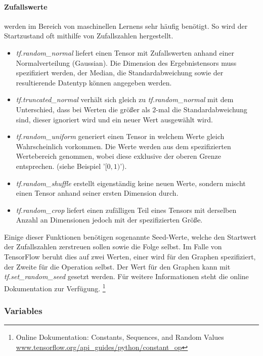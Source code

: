 \paragraph{Zufallswerte} werden im Bereich von maschinellen Lernens sehr häufig benötigt. 
So wird der Startzustand oft mithilfe von Zufallszahlen hergestellt. 

\begin{itemize}
	\item \textit{tf.random\_normal} liefert einen Tensor mit Zufallswerten anhand einer Normalverteilung (Gaussian). 
	Die Dimension des Ergebnistensors muss spezifiziert werden, der Median, die Standardabweichung sowie der resultierende Datentyp können angegeben werden. 
	\item \textit{tf.truncated\_normal} verhält sich gleich zu \textit{tf.random\_normal} mit dem Unterschied, dass bei Werten die größer als $2$-mal die Standardabweichung sind, dieser ignoriert wird und ein neuer Wert ausgewählt wird.
	\item \textit{tf.random\_uniform} generiert einen Tensor in welchem Werte gleich Wahrscheinlich vorkommen.
	Die Werte werden aus dem spezifizierten Wertebereich genommen, wobei diese exklusive der oberen Grenze entsprechen. (siehe Beispiel '$[0, 1)$').
	\item \textit{tf.random\_shuffle} erstellt eigenständig keine neuen Werte, sondern mischt einen Tensor anhand seiner ersten Dimension durch. 
	\item \textit{tf.random\_crop} liefert einen zufälligen Teil eines Tensors mit derselben Anzahl an Dimensionen jedoch mit der spezifizierten Größe.
\end{itemize} \phantom \newline

\noindent
Einige dieser Funktionen benötigen sogenannte Seed-Werte, welche den Startwert der Zufallszahlen zerstreuen sollen sowie die Folge selbst. 
Im Falle von TensorFlow beruht dies auf zwei Werten, einer wird für den Graphen spezifiziert, der Zweite für die Operation selbst. 
Der Wert für den Graphen kann mit \textit{tf.set\_random\_seed} gesetzt werden. 
Für weitere Informationen steht die online Dokumentation zur Verfügung. \footnote{Online Dokumentation: Constants, Sequences, and Random Values  \url{www.tensorflow.org/api_guides/python/constant_op}}

\subsubsection{Variables}

